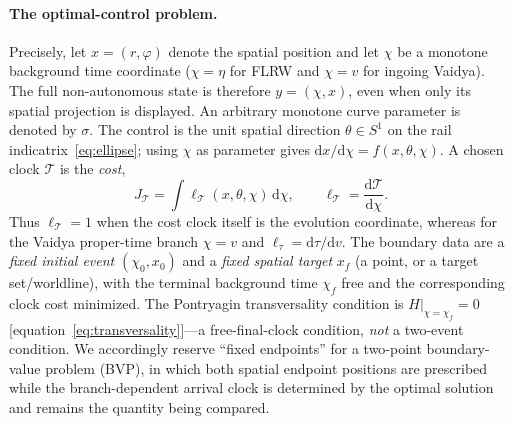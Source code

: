 \documentclass[12pt]{iopart}
\newcommand{\dd}{\mathrm{d}}
\begin{document}
\paragraph{The optimal-control problem.} Precisely, let $x=(r,\varphi)$ denote the
spatial position and let $\chi$ be a monotone background time coordinate ($\chi=\eta$
for FLRW and $\chi=v$ for ingoing Vaidya). The full non-autonomous state is therefore
$y=(\chi,x)$, even when only its spatial projection is displayed. An arbitrary monotone
curve parameter is denoted by $\sigma$. The control is the unit spatial direction
$\theta\in S^1$ on the rail indicatrix~\eqref{eq:ellipse}; using $\chi$ as parameter gives
$\dd x/\dd\chi=f(x,\theta,\chi)$. A chosen clock $\mathcal T$ is the \emph{cost},
\[
    J_{\mathcal T}=\int \ell_{\mathcal T}(x,\theta,\chi)\,\dd\chi,
    \qquad \ell_{\mathcal T}=\frac{\dd\mathcal T}{\dd\chi}.
\]
Thus $\ell_{\mathcal T}=1$ when the cost clock itself is the evolution coordinate,
whereas for the Vaidya proper-time branch $\chi=v$ and
$\ell_\tau=\dd\tau/\dd v$. The boundary data are a \emph{fixed initial event}
$(\chi_0,x_0)$ and a \emph{fixed spatial target} $x_f$ (a point, or a target
set/worldline), with the terminal background time $\chi_f$ free and the corresponding
clock cost minimized. The Pontryagin transversality condition is
$H|_{\chi=\chi_f}=0$ [equation~\eqref{eq:transversality}]---a free-final-clock condition,
\emph{not} a two-event condition. We accordingly reserve ``fixed endpoints'' for a
two-point boundary-value problem (BVP), in which both spatial endpoint positions are
prescribed while the branch-dependent arrival clock is determined by the optimal
solution and remains the quantity being compared.
\end{document}
